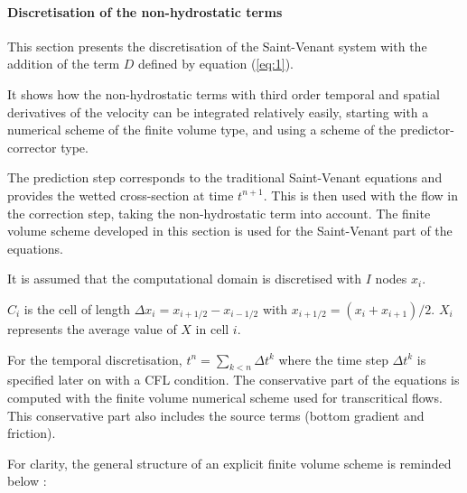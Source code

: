 \paragraph{Discretisation of the non-hydrostatic terms\\}

\hspace*{1cm}

This section presents the discretisation of the Saint-Venant system with the addition of the term $D$ defined by equation (\ref{eq:1}).

\vspace{0.5cm}

It shows how the non-hydrostatic terms with third order temporal and spatial derivatives of the velocity can be integrated relatively easily, starting with a numerical scheme of the finite volume type, and using a scheme of the predictor-corrector type.

\vspace{0.5cm}

The prediction step corresponds to the traditional Saint-Venant equations and provides the wetted cross-section at time $t^{n+1}$. This is then used with the flow in the correction step, taking the non-hydrostatic term into account. The finite volume scheme developed in this section is used for the Saint-Venant part of the equations.

\vspace{0.5cm}

It is assumed that the computational domain is discretised with $I$ nodes $x_i$.

\vspace{0.5cm}

$C_i$ is the cell of length $\Delta x_i=x_{i+1/2}-x_{i-1/2}$ with $x_{i+1/2}=(x_i+x_{i+1})/2$. 
$X_i$ represents the average value of $X$ in cell $i$.

\vspace{0.5cm}

For the temporal discretisation, $t^n = \sum_{k < n} \Delta t^k$ where the time step $\Delta t^k$ is specified later on with a CFL condition.
The conservative part of the equations is computed with the finite volume numerical scheme used for transcritical flows. This conservative part also includes the source terms (bottom gradient and friction). 

\vspace{0.5cm}

For clarity, the general structure of an explicit finite volume scheme is reminded below :

